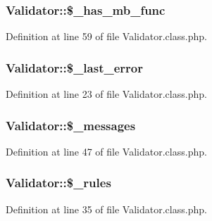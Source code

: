 \subsubsection[{\texorpdfstring{\$\+\_\+has\+\_\+mb\+\_\+func}{$_has_mb_func}}]{\setlength{\rightskip}{0pt plus 5cm}Validator\+::\$\+\_\+has\+\_\+mb\+\_\+func}\hypertarget{classValidator_a8ac5ee1cf7a5ba237ee40c61a5d834c1}{}\label{classValidator_a8ac5ee1cf7a5ba237ee40c61a5d834c1}


Definition at line 59 of file Validator.\+class.\+php.

\subsubsection[{\texorpdfstring{\$\+\_\+last\+\_\+error}{$_last_error}}]{\setlength{\rightskip}{0pt plus 5cm}Validator\+::\$\+\_\+last\+\_\+error}\hypertarget{classValidator_a1b957a11848d8cb550fc578052f49588}{}\label{classValidator_a1b957a11848d8cb550fc578052f49588}


Definition at line 23 of file Validator.\+class.\+php.

\subsubsection[{\texorpdfstring{\$\+\_\+messages}{$_messages}}]{\setlength{\rightskip}{0pt plus 5cm}Validator\+::\$\+\_\+messages}\hypertarget{classValidator_ac9f1f384dc723b2a4581e83066fba49c}{}\label{classValidator_ac9f1f384dc723b2a4581e83066fba49c}


Definition at line 47 of file Validator.\+class.\+php.

\subsubsection[{\texorpdfstring{\$\+\_\+rules}{$_rules}}]{\setlength{\rightskip}{0pt plus 5cm}Validator\+::\$\+\_\+rules}\hypertarget{classValidator_ab0ec00f502a96e6c95d963fe8cf40c00}{}\label{classValidator_ab0ec00f502a96e6c95d963fe8cf40c00}


Definition at line 35 of file Validator.\+class.\+php.

